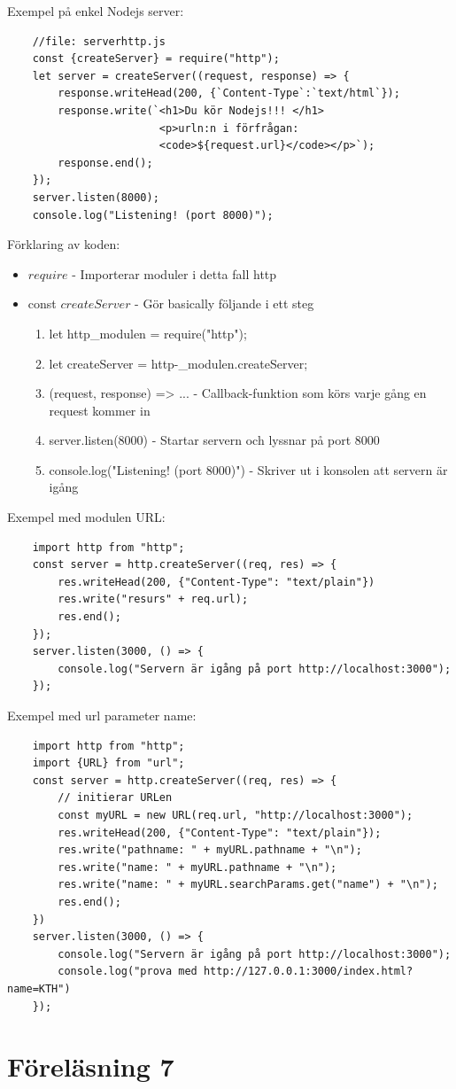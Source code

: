 \documentclass[12pt,a4paper]{article}
\begin{document}
Exempel på enkel Nodejs server:
\begin{verbatim}
    //file: serverhttp.js
    const {createServer} = require("http");
    let server = createServer((request, response) => {
        response.writeHead(200, {`Content-Type`:`text/html`});
        response.write(`<h1>Du kör Nodejs!!! </h1>
                        <p>urln:n i förfrågan:
                        <code>${request.url}</code></p>`);
        response.end();
    });
    server.listen(8000);
    console.log("Listening! (port 8000)");
\end{verbatim}

Förklaring av koden:
\begin{itemize}
    \item $require$ - Importerar moduler i detta fall http
    \item const $createServer$ - Gör basically följande i ett steg
    \begin{enumerate}
        \item let http\_modulen = require("http");
        \item let createServer = http-\_modulen.createServer;
        \item (request, response) => {...} - Callback-funktion som körs varje gång en request kommer in
        \item server.listen(8000) - Startar servern och lyssnar på port 8000
        \item console.log("Listening! (port 8000)") - Skriver ut i konsolen att servern är igång
    \end{enumerate}
\end{itemize}

Exempel med modulen URL:
\begin{verbatim}
    import http from "http";
    const server = http.createServer((req, res) => {
        res.writeHead(200, {"Content-Type": "text/plain"})
        res.write("resurs" + req.url);
        res.end();
    });
    server.listen(3000, () => {
        console.log("Servern är igång på port http://localhost:3000");
    });
\end{verbatim}

Exempel med url parameter name:
\begin{verbatim}
    import http from "http";
    import {URL} from "url";
    const server = http.createServer((req, res) => {
        // initierar URLen
        const myURL = new URL(req.url, "http://localhost:3000");
        res.writeHead(200, {"Content-Type": "text/plain"});
        res.write("pathname: " + myURL.pathname + "\n");
        res.write("name: " + myURL.pathname + "\n");
        res.write("name: " + myURL.searchParams.get("name") + "\n");
        res.end();
    })
    server.listen(3000, () => {
        console.log("Servern är igång på port http://localhost:3000");
        console.log("prova med http://127.0.0.1:3000/index.html?name=KTH")
    });
\end{verbatim}

\section{Föreläsning 7}
\end{document}
